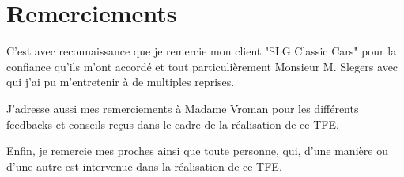 \setcounter{page}{0}
\section*{Remerciements}

C'est avec reconnaissance que je remercie mon client "SLG Classic Cars" pour la confiance qu'ils m'ont accordé et tout particulièrement Monsieur M. Slegers avec qui j'ai pu m'entretenir à de multiples reprises.

\newpara
J'adresse aussi mes remerciements à Madame Vroman pour les différents feedbacks et conseils reçus dans le cadre de la réalisation de ce TFE.

\newpara
Enfin, je remercie mes proches ainsi que toute personne, qui, d'une manière ou d'une autre est intervenue dans la réalisation de ce TFE. 

